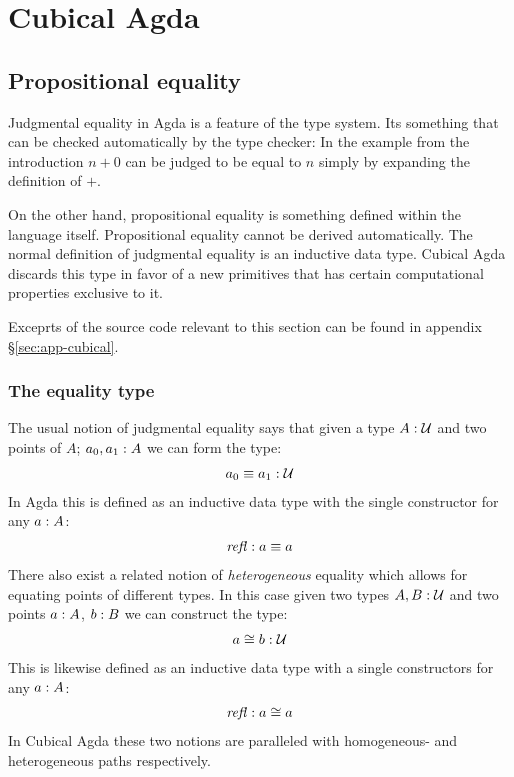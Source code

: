 \chapter{Cubical Agda}
\section{Propositional equality}
Judgmental equality in Agda is a feature of the type system. Its something that
can be checked automatically by the type checker: In the example from the
introduction $n + 0$ can be judged to be equal to $n$ simply by expanding the
definition of $+$.

On the other hand, propositional equality is something defined within the
language itself. Propositional equality cannot be derived automatically. The
normal definition of judgmental equality is an inductive data type. Cubical Agda
discards this type in favor of a new primitives that has certain computational
properties exclusive to it.

Exceprts of the source code relevant to this section can be found in appendix
\S\ref{sec:app-cubical}.

\subsection{The equality type}
The usual notion of judgmental equality says that given a type $A \mathrel{:} \mathcal{U}$ and
two points of $A$; $a_0, a_1 \mathrel{:} A$ we can form the type:
%
\begin{align}
  a_0 \equiv a_1 \mathrel{:} \mathcal{U}
\end{align}
%
In Agda this is defined as an inductive data type with the single constructor
for any $a \mathrel{:} A$:
%
\begin{align}
  \refl \tp a \equiv a
\end{align}
%
There also exist a related notion of \emph{heterogeneous} equality which allows
for equating points of different types. In this case given two types $A, B \mathrel{:}
\mathcal{U}$ and two points $a \mathrel{:} A$, $b \mathrel{:} B$ we can construct the type:
%
\begin{align}
  a \cong b \mathrel{:} \mathcal{U}
\end{align}
%
This is likewise defined as an inductive data type with a single constructors
for any $a \mathrel{:} A$:
%
\begin{align}
  \refl \tp a \cong a
\end{align}
%
In Cubical Agda these two notions are paralleled with homogeneous- and
heterogeneous paths respectively.
%
